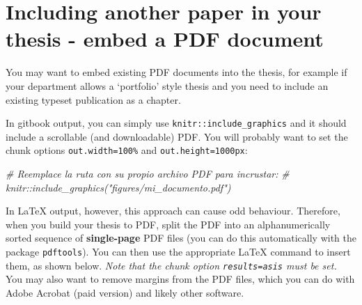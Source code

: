 \documentclass[a4paper, nobind]{templates/ociamthesis}
\newenvironment{Shaded}{\begin{snugshade}}{\end{snugshade}}
\newcommand{\CommentTok}[1]{\textcolor[rgb]{0.56,0.35,0.01}{\textit{#1}}}
\renewenvironment{Shaded}
{
  \vspace{10pt}%
  \begin{snugshade}%
}{%
  \end{snugshade}%
  \vspace{8pt}%
}
\begin{document}
\section{Including another paper in your thesis - embed a PDF document}\label{embed-pdf}

You may want to embed existing PDF documents into the thesis, for example if your department allows a `portfolio' style thesis and you need to include an existing typeset publication as a chapter.

In gitbook output, you can simply use \texttt{knitr::include\_graphics} and it should include a scrollable (and downloadable) PDF.
You will probably want to set the chunk options \texttt{out.width=\textquotesingle{}100\%\textquotesingle{}} and \texttt{out.height=\textquotesingle{}1000px\textquotesingle{}}:

\begin{Shaded}
\begin{Highlighting}[]
\CommentTok{\# Reemplace la ruta con su propio archivo PDF para incrustar:}
\CommentTok{\# knitr::include\_graphics("figures/mi\_documento.pdf")}
\end{Highlighting}
\end{Shaded}

In LaTeX output, however, this approach can cause odd behaviour.
Therefore, when you build your thesis to PDF, split the PDF into an alphanumerically sorted sequence of \textbf{single-page} PDF files (you can do this automatically with the package \texttt{pdftools}). You can then use the appropriate LaTeX command to insert them, as shown below.
\emph{Note that the chunk option \texttt{results=\textquotesingle{}asis\textquotesingle{}} must be set.}
You may also want to remove margins from the PDF files, which you can do with Adobe Acrobat (paid version) and likely other software.
\end{document}
